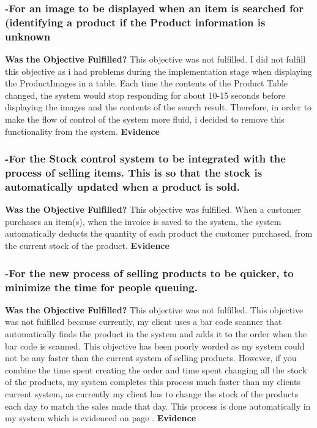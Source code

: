 \subsubsection{-For an image to be displayed when an item is searched for (identifying a product if the Product information is unknown}
\textbf{Was the Objective Fulfilled?} \newline
This objective was not fulfilled. I did not fulfill this objective as i had problems during the implementation stage when displaying the ProductImages in a table. Each time the contents of the Product Table changed, the system would stop responding for about 10-15 seconds before displaying the images and the contents of the search result. Therefore, in order to make the flow of control of the system more fluid, i decided to remove this functionality from the system. 
\textbf{Evidence} \newline





\subsubsection{-For the Stock control system to be integrated with the process of selling items. This is so that the stock is automatically updated when a product is sold.}
\textbf{Was the Objective Fulfilled?} \newline
This objective was fulfilled. When a customer purchases an item(s), when the invoice is saved to the system, the system automatically deducts the quantity of each product the customer purchased, from the current stock of the product.
\textbf{Evidence} \newline




\subsubsection{-For the new process of selling products to be quicker, to minimize the time for people queuing.}
\textbf{Was the Objective Fulfilled?} \newline
This objective was not fulfilled. This objective was not fulfilled because currently, my client uses a bar code scanner that automatically finds the product in the system and adds it to the order when the bar code is scanned. This objective has been poorly worded as my system could not be any faster than the current system of selling products. However, if you combine the time spent creating the order and time spent changing all the stock of the products, my system completes this process much faster than my clients current system, as currently my client has to change the stock of the products each day to match the sales made that day. This process is done automatically in my system which is evidenced on page \pageref{}.
\textbf{Evidence} \newline




